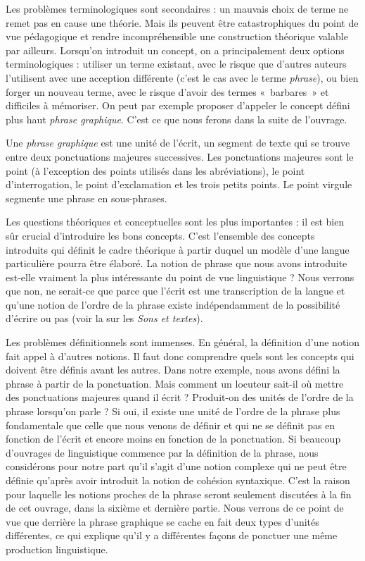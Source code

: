 {    Les problèmes terminologiques sont secondaires : un mauvais choix de terme ne remet pas en cause une théorie. Mais ils peuvent être catastrophiques du point de vue pédagogique et rendre incompréhensible une construction théorique valable par ailleurs. Lorsqu’on introduit un concept, on a principalement deux options terminologiques : utiliser un terme existant, avec le risque que d’autres auteurs l’utilisent avec une acception différente (c’est le cas avec le terme \textit{phrase}), ou bien forger un nouveau terme, avec le risque d’avoir des termes «~barbares~» et difficiles à mémoriser. On peut par exemple proposer d’appeler le concept défini plus haut \textit{phrase graphique}. C’est ce que nous ferons dans la suite de l’ouvrage.

    Une \textit{phrase graphique} est une unité de l’écrit, un segment de texte qui se trouve entre deux ponctuations majeures successives. Les ponctuations majeures sont le point (à l’exception des points utilisés dans les abréviations), le point d’interrogation, le point d’exclamation et les trois petits points. Le point virgule segmente une phrase en sous-phrases.

    Les questions théoriques et conceptuelles sont les plus importantes : il est bien sûr crucial d’introduire les bons concepts. C’est l’ensemble des concepts introduits qui définit le cadre théorique à partir duquel un modèle d’une langue particulière pourra être élaboré. La notion de phrase que nous avons introduite est-elle vraiment la plus intéressante du point de vue linguistique ? Nous verrons que non, ne serait-ce que parce que l’écrit est une transcription de la langue et qu’une notion de l’ordre de la phrase existe indépendamment de la possibilité d’écrire ou pas (voir la  sur les \textit{Sons et textes}).

    Les problèmes définitionnels sont immenses. En général, la définition d’une notion fait appel à d’autres notions. Il faut donc comprendre quels sont les concepts qui doivent être définis avant les autres. Dans notre exemple, nous avons défini la phrase à partir de la ponctuation. Mais comment un locuteur sait-il où mettre des ponctuations majeures quand il écrit ? Produit-on des unités de l’ordre de la phrase lorsqu’on parle ? Si oui, il existe une unité de l’ordre de la phrase plus fondamentale que celle que nous venons de définir et qui ne se définit pas en fonction de l’écrit et encore moins en fonction de la ponctuation. Si beaucoup d’ouvrages de linguistique commence par la définition de la phrase, nous considérons pour notre part qu’il s’agit d’une notion complexe qui ne peut être définie qu’après avoir introduit la notion de cohésion syntaxique. C’est la raison pour laquelle les notions proches de la phrase seront seulement discutées à la fin de cet ouvrage, dans la sixième et dernière partie. Nous verrons de ce point de vue que derrière la phrase graphique se cache en fait deux types d’unités différentes, ce qui explique qu’il y a différentes façons de ponctuer une même production linguistique.
}
